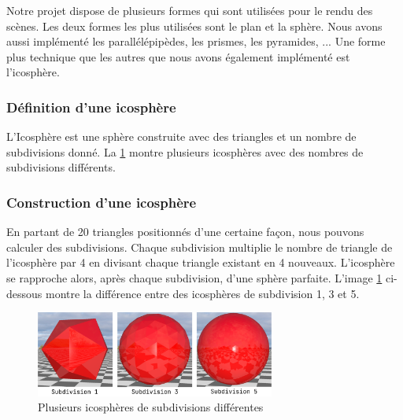 \documentclass[12pt]{article}
\begin{document}
Notre projet dispose de plusieurs formes qui sont utilisées pour le rendu des scènes. Les deux formes les plus utilisées sont le plan et la sphère. Nous avons aussi implémenté les parallélépipèdes, les prismes, les pyramides, ...
Une forme plus technique que les autres que nous avons également implémenté est l'icosphère.
\subsubsection{Définition d'une icosphère}
L'Icosphère est une sphère construite avec des triangles et un nombre de subdivisions donné. La \figurename \ref{fig:image_subdiv} montre plusieurs icosphères avec des nombres de subdivisions différents.

\subsubsection{Construction d'une icosphère}
En partant de 20 triangles positionnés d'une certaine façon, nous pouvons calculer des subdivisions.
Chaque subdivision multiplie le nombre de triangle de l'icosphère par 4 en divisant chaque triangle existant en 4 nouveaux.
L'icosphère se rapproche alors, après chaque subdivision, d'une sphère parfaite.
L'image \ref{fig:image_subdiv} ci-dessous montre la différence entre des icosphères de subdivision 1, 3 et 5.

\begin{figure}[ht]
  \begin{center}
    \includegraphics[width=0.7\textwidth]{./img/formes/subdivicosp.png} 
  \caption{Plusieurs icosphères de subdivisions différentes}
  \label{fig:image_subdiv}
\end{center}
\end{figure}
\FloatBarrier
\end{document}
